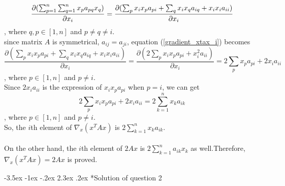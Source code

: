 \documentclass[12pt]{article}
\makeatletter
\renewcommand\section{\@startsection {section}{1}{\z@}%
	{-3.5ex \@plus -1ex \@minus -.2ex}%
	{2.3ex \@plus.2ex}%
	{\normalfont\large\bfseries}}%
\makeatother
\begin{document}
	\begin{equation}\label{gradient_xtax_i}
	\frac{\partial(\sum_{p=1}^n \sum_{q=1}^n x_pa_{pq}x_q)}{\partial x_i} \\
	=\frac{\partial(\sum_{p} x_ix_pa_{pi}+\sum_{q} x_ix_qa_{iq}+x_ix_ia_{ii})}{\partial x_i}
	\end{equation}
	, where $q, p \in [1, n]$ and $p\neq q\neq i$.
	\\
	since matrix $A$ is symmetrical, $a_{ij}=a_{ji}$, equation (\ref{gradient_xtax_i}) becomes
	\begin{equation}\label{gradient_xtax_i_mod}
	\frac{\partial(\sum_{p} x_ix_pa_{pi}+\sum_{q} x_ix_qa_{iq}+x_ix_ia_{ii})}{\partial x_i}
	=\frac{\partial(2\sum_{p} x_ix_pa_{pi}+x_i^2a_{ii})}{\partial x_i}
	=2\sum_{p} x_pa_{pi}+2x_ia_{ii}
	\end{equation}
	, where $p \in [1, n]$ and $p\neq i$.\\
	Since $2x_ia_{ii}$ is the expression of $x_ix_pa_{pi}$ when $p=i$, we can get
	\begin{equation}\label{gradient_xtax_i_final}
	2\sum_{p} x_ix_pa_{pi}+2x_ia_{ii}
	=2\sum_{k=1}^n x_ka_{ik}
	\end{equation}
	, where $p \in [1, n]$ and $p\neq i$.\\
	So, the $i$th element of $\nabla_x(x^TAx)$ is $2\sum_{k=1}^n x_ka_{ik}$.\\
	\\
	\noindent
	On the other hand, the $i$th element of $2Ax$ is $2\sum_{k=1}^n a_{ik}x_k$ as well.Therefore, $\nabla_x(x^TAx)=2Ax$ is proved.
	
	\section*{Solution of question 2}
	
\end{document}
